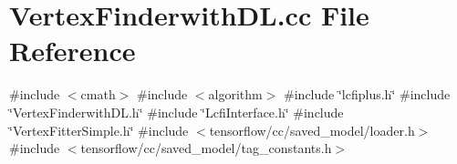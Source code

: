 \section{Vertex\+Finderwith\+D\+L.\+cc File Reference}
\label{VertexFinderwithDL_8cc}
{\ttfamily \#include $<$cmath$>$}\newline
{\ttfamily \#include $<$algorithm$>$}\newline
{\ttfamily \#include \char`\"{}lcfiplus.\+h\char`\"{}}\newline
{\ttfamily \#include \char`\"{}Vertex\+Finderwith\+D\+L.\+h\char`\"{}}\newline
{\ttfamily \#include \char`\"{}Lcfi\+Interface.\+h\char`\"{}}\newline
{\ttfamily \#include \char`\"{}Vertex\+Fitter\+Simple.\+h\char`\"{}}\newline
{\ttfamily \#include $<$tensorflow/cc/saved\+\_\+model/loader.\+h$>$}\newline
{\ttfamily \#include $<$tensorflow/cc/saved\+\_\+model/tag\+\_\+constants.\+h$>$}\newline
